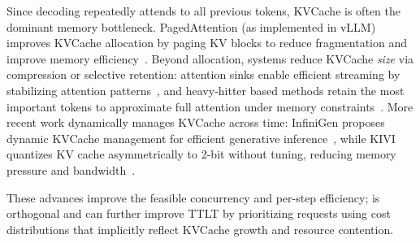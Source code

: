 Since decoding repeatedly attends to all previous tokens, KVCache is often the dominant memory bottleneck. PagedAttention (as implemented in vLLM) improves KVCache allocation by paging KV blocks to reduce fragmentation and improve memory efficiency~\cite{kwon2023efficient}. Beyond allocation, systems reduce KVCache \emph{size} via compression or selective retention: attention sinks enable efficient streaming by stabilizing attention patterns~\cite{xiao2023efficient}, and heavy-hitter based methods retain the most important tokens to approximate full attention under memory constraints~\cite{zhang2023h2o}. More recent work dynamically manages KVCache across time: InfiniGen proposes dynamic KVCache management for efficient generative inference~\cite{lee2024infinigen}, while KIVI quantizes KV cache asymmetrically to 2-bit without tuning, reducing memory pressure and bandwidth~\cite{liu2024kivi}. 

These advances improve the feasible concurrency and per-step efficiency; \oursched is orthogonal and can further improve TTLT by prioritizing requests using cost distributions that implicitly reflect KVCache growth and resource contention.





